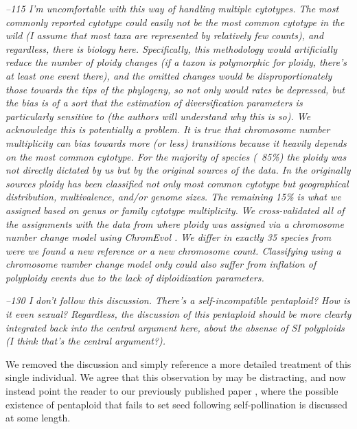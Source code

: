 \documentclass[11pt]{article}
\renewenvironment{quote}{\bigskip\noindent\itshape\ignorespaces}{\smallskip}
\begin{document}
\begin{quote}
--115 I'm uncomfortable with this way of handling multiple cytotypes.
The most commonly reported cytotype could easily not be the most common cytotype in the wild (I assume that most taxa are represented by relatively few counts), and regardless, there is biology here.
Specifically, this methodology would artificially reduce the number of ploidy changes (if a taxon is polymorphic for ploidy, there's at least one event there), and the omitted changes would be disproportionately those towards the tips of the phylogeny, so not only would rates be depressed, but the bias is of a sort that the estimation of diversification parameters is particularly sensitive to (the authors will understand why this is so).
\end{quote}
We acknowledge this is potentially a problem. It is true that chromosome number multiplicity can bias towards more (or less) transitions because it heavily depends on the most common cytotype. For the majority of species (~85\%)  the ploidy was not directly dictated by us but by the original sources of the data. In the originally sources ploidy has been classified not only most common cytotype but geographical distribution, multivalence, and/or  genome sizes. The remaining 15\% is what we assigned based on genus or family cytotype multiplicity. We cross-validated all of the assignments with the data from \citet{robertson_2011} where ploidy was assigned via a chromosome number change model using ChromEvol \citep{mayrose_2010}. We differ in exactly 35 species from \citet{robertson_2011} were we found a new reference or a new chromosome count. Classifying using a chromosome number change model only could also suffer from inflation of polyploidy events due to the lack of diploidization parameters. 

\begin{quote}
--130 I don't follow this discussion.
There's a self-incompatible pentaploid?
How is it even sexual?
Regardless, the discussion of this pentaploid should be more clearly integrated back into the central argument here, about the absense of SI polyploids (I think that's the central argument?).
\end{quote}

We removed the discussion and simply reference a more detailed treatment of this single individual.
We agree that this observation by \citet{camadro_1981} may be distracting, and now instead  point the reader to our previously published paper \citep{robertson_2011}, where the possible existence of pentaploid that fails to set seed following self-pollination is discussed at some length.
\end{document}
